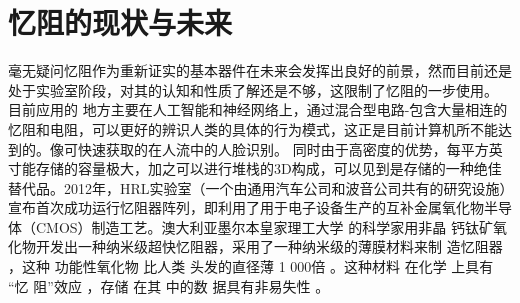 \documentclass[UTF8]{article}
\begin{document}
\section{忆阻的现状与未来}
毫无疑问忆阻作为重新证实的基本器件在未来会发挥出良好的前景，然而目前还是处于实验室阶段，对其的认知和性质了解还是不够，这限制了忆阻的一步使用。
目前应用的 地方主要在人工智能和神经网络上，通过混合型电路-包含大量相连的忆阻和电阻，可以更好的辨识人类的具体的行为模式，这正是目前计算机所不能达到的。像可快速获取的在人流中的人脸识别。
同时由于高密度的优势，每平方英寸能存储的容量极大，加之可以进行堆栈的3D构成，可以见到是存储的一种绝佳替代品。2012年，HRL实验室（一个由通用汽车公司和波音公司共有的研究设施）宣布首次成功运行忆阻器阵列，即利用了用于电子设备生产的互补金属氧化物半导体（CMOS）制造工艺。澳大利亚墨尔本皇家理工大学 的科学家用非晶 钙钛矿氧化物开发出一种纳米级超快忆阻器，采用了一种纳米级的薄膜材料来制 造忆阻器 ，这种 功能性氧化物 比人类 头发的直径薄 1 000倍 。这种材料 在化学 上具有 “忆 阻”效应 ，存储 在其 中的数 据具有非易失性 。 
\end{document}
